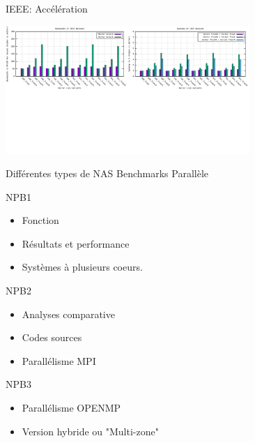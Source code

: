 \documentclass{beamer}
\begin{document}
\begin{frame}{IEEE: Accélération}

  \centering\includegraphics[width=350px]{../ressources/vm_ieee.png}
  
\end{frame}

\begin{frame}{Différentes types de NAS Benchmarks Parallèle}

  \begin{block}{NPB1}
    \begin{itemize}
    \item Fonction
    \item Résultats et performance
    \item Systèmes à plusieurs coeurs.
    \end{itemize}
  \end{block}
  
  \begin{block}{NPB2}
    \begin{itemize}
    \item Analyses comparative
    \item Codes sources
    \item Parallélisme  MPI
    \end{itemize}
  \end{block}
  
  \begin{block}{NPB3}
    \begin{itemize}
    \item Parallélisme OPENMP
    \item Version hybride ou "Multi-zone" 
    \end{itemize}
  \end{block}

\end{frame}
\end{document}
